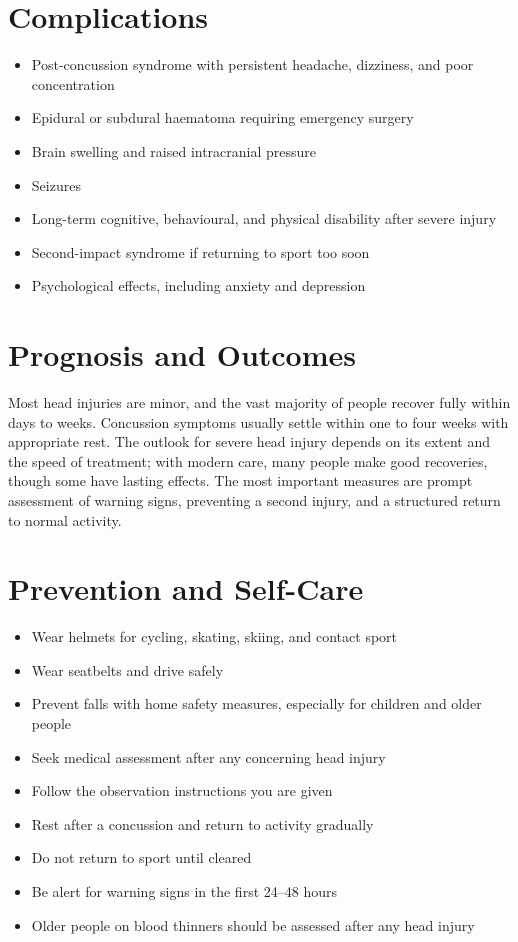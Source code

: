 \section*{Complications}
\begin{itemize}
    \item Post-concussion syndrome with persistent headache, dizziness, and poor concentration
    \item Epidural or subdural haematoma requiring emergency surgery
    \item Brain swelling and raised intracranial pressure
    \item Seizures
    \item Long-term cognitive, behavioural, and physical disability after severe injury
    \item Second-impact syndrome if returning to sport too soon
    \item Psychological effects, including anxiety and depression
\end{itemize}

\section*{Prognosis and Outcomes}
Most head injuries are minor, and the vast majority of people recover fully within days to weeks. Concussion symptoms usually settle within one to four weeks with appropriate rest. The outlook for severe head injury depends on its extent and the speed of treatment; with modern care, many people make good recoveries, though some have lasting effects. The most important measures are prompt assessment of warning signs, preventing a second injury, and a structured return to normal activity.

\section*{Prevention and Self-Care}
\begin{itemize}
    \item Wear helmets for cycling, skating, skiing, and contact sport
    \item Wear seatbelts and drive safely
    \item Prevent falls with home safety measures, especially for children and older people
    \item Seek medical assessment after any concerning head injury
    \item Follow the observation instructions you are given
    \item Rest after a concussion and return to activity gradually
    \item Do not return to sport until cleared
    \item Be alert for warning signs in the first 24--48 hours
    \item Older people on blood thinners should be assessed after any head injury
\end{itemize}

